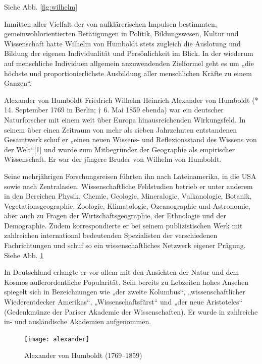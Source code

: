 Siehe Abb. \ref{fig:wilhelm}

Inmitten aller Vielfalt der von aufklärerischen Impulsen bestimmten, gemeinwohlorientierten Betätigungen in Politik, Bildungswesen, Kultur und Wissenschaft hatte Wilhelm von Humboldt stets zugleich die Auslotung und Bildung der eigenen Individualität und Persönlichkeit im Blick. In der wiederum auf menschliche Individuen allgemein anzuwendenden Zielformel geht es um „die höchste und proportionierlichste Ausbildung aller menschlichen Kräfte zu einem Ganzen“.


Alexander von Humboldt
Friedrich Wilhelm Heinrich Alexander von Humboldt (* 14. September 1769 in Berlin; † 6. Mai 1859 ebenda) war ein deutscher Naturforscher mit einem weit über Europa hinausreichenden Wirkungsfeld. In seinem über einen Zeitraum von mehr als sieben Jahrzehnten entstandenen Gesamtwerk schuf er „einen neuen Wissens- und Reflexionsstand des Wissens von der Welt“[1] und wurde zum Mitbegründer der Geographie als empirischer Wissenschaft. Er war der jüngere Bruder von Wilhelm von Humboldt.

Seine mehrjährigen Forschungsreisen führten ihn nach Lateinamerika, in die USA sowie nach Zentralasien. Wissenschaftliche Feldstudien betrieb er unter anderem in den Bereichen Physik, Chemie, Geologie, Mineralogie, Vulkanologie, Botanik, Vegetationsgeographie, Zoologie, Klimatologie, Ozeanographie und Astronomie, aber auch zu Fragen der Wirtschaftsgeographie, der Ethnologie und der Demographie. Zudem korrespondierte er bei seinem publizistischen Werk mit zahlreichen international bedeutenden Spezialisten der verschiedenen Fachrichtungen und schuf so ein wissenschaftliches Netzwerk eigener Prägung.
Siehe Abb. \ref{fig:alexander}

In Deutschland erlangte er vor allem mit den Ansichten der Natur und dem Kosmos außerordentliche Popularität. Sein bereits zu Lebzeiten hohes Ansehen spiegelt sich in Bezeichnungen wie „der zweite Kolumbus“, „wissenschaftlicher Wiederentdecker Amerikas“, „Wissenschaftsfürst“ und „der neue Aristoteles“ (Gedenkmünze der Pariser Akademie der Wissenschaften). Er wurde in zahlreiche in- und ausländische Akademien aufgenommen.

\begin{figure}
\texttt{[image: alexander]}
\caption{Alexander von Humboldt (1769--1859)}
\label{fig:alexander}
\end{figure}


